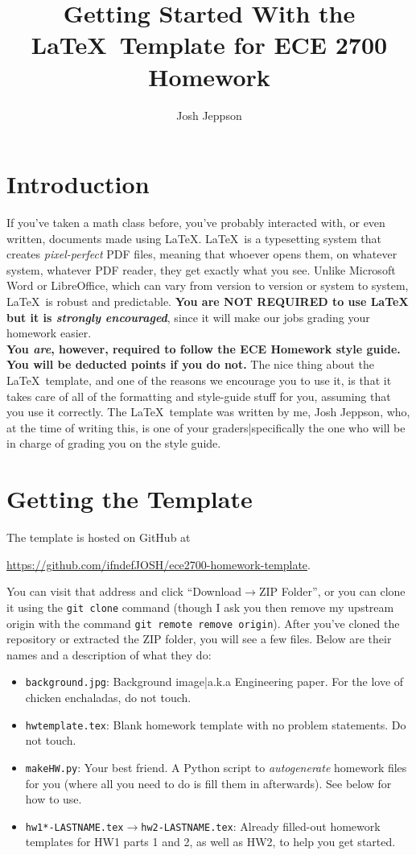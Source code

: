 \documentclass[a4paper,10pt]{article}
\title{Getting Started With the \LaTeX\ Template for ECE 2700 Homework}
\author{Josh Jeppson}
\begin{document}
\maketitle

\section{Introduction}

If you've taken a math class before, you've probably interacted with, or even written, documents made using \LaTeX. \LaTeX\ is a typesetting system that creates \emph{pixel-perfect} PDF files, meaning that whoever opens them, on whatever system, whatever PDF reader, they get exactly what you see. Unlike Microsoft Word or LibreOffice, which can vary from version to version or system to system, \LaTeX\ is robust and predictable. \textbf{You are NOT REQUIRED to use \LaTeX\, but it is \textit{strongly encouraged}}, since it will make our jobs grading your homework easier.
\\[10pt]
\textbf{You \emph{are}, however, required to follow the ECE Homework style guide. You will be deducted points if you do not.} The nice thing about the \LaTeX\ template, and one of the reasons we encourage you to use it, is that it takes care of all of the formatting and style-guide stuff for you, assuming that you use it correctly. The \LaTeX\ template was written by me, Josh Jeppson, who, at the time of writing this, is one of your graders|specifically the one who will be in charge of grading you on the style guide.

\section{Getting the Template}

The template is hosted on GitHub at
\begin{center}
\url{https://github.com/ifndefJOSH/ece2700-homework-template}.
\end{center}
You can visit that address and click ``Download$\to$ZIP Folder'', or you can clone it using the \texttt{git clone} command (though I ask you then remove my upstream origin with the command \texttt{git remote remove origin}). After you've cloned the repository or extracted the ZIP folder, you will see a few files. Below are their names and a description of what they do:
\begin{itemize}
	\item \texttt{background.jpg}: Background image|a.k.a Engineering paper. For the love of chicken enchaladas, do not touch.
	\item \texttt{hwtemplate.tex}: Blank homework template with no problem statements. Do not touch.
	\item \texttt{makeHW.py}: Your best friend. A Python script to \emph{autogenerate} homework files for you (where all you need to do is fill them in afterwards). See below for how to use.
	\item \texttt{hw1*-LASTNAME.tex}$\to$\texttt{hw2-LASTNAME.tex}: Already filled-out homework templates for HW1 parts 1 and 2, as well as HW2, to help you get started.
\end{itemize}
\end{document}
